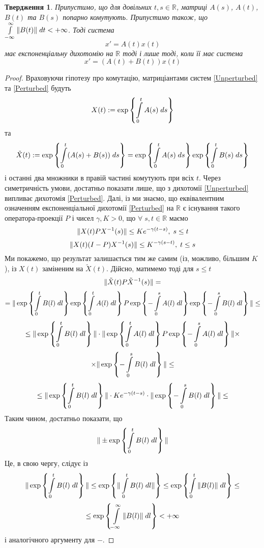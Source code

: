 \documentclass[14pt]{extarticle} %
\title{}
\author{Олексій Леонтьєв}
\let\oldforall\forall
\renewcommand{\forall}{\oldforall\;}
\newtheorem{proposition}{Твердження}
\theoremstyle{remark}
\begin{document}
\maketitle
\begin{proposition}Припустимо, що для довільних $t,s\in\mathbb{R}$, матриці $A(s)$, $A(t)$, $B(t)$ та $B(s)$ попарно комутують.
	Припустимо також, що $\int_{-\infty}^\infty\mynorm{B(t)}\;dt<+\infty$. Тоді система 
	\begin{equation}\label{Unperturbed}
	x'=A(t)x(t)
	\end{equation}
	має експоненціальну дихотомію на $\mathbb{R}$ тоді і лише тоді, коли її має система
	\begin{equation}\label{Perturbed}
	x'=(A(t)+B(t))x(t)
	\end{equation}
\end{proposition}
\begin{proof}Враховуючи гіпотезу про комутацію, матриціантами систем \eqref{Unperturbed} та \eqref{Perturbed} будуть
	\[X(t):=\exp\mycbra{\int_0^tA(s)\;ds}\]
	та \[\tilde{X}(t):=\exp\mycbra{\int_0^t(A(s)+B(s))\;ds}=\exp\mycbra{\int_0^tA(s)\;ds}\exp\mycbra{\int_0^tB(s)\;ds}\]
	і останні два множники в правій частині комутують при всіх $t$.
	Через симетричність умови, достатньо показати лише, що з дихотомії \eqref{Unperturbed} випливає дихотомія \eqref{Perturbed}.
	Далі, із \cite{coppel} ми знаємо, що еквівалентним означенням експоненціальної дихотомії \eqref{Perturbed}
	на $\mathbb{R}$ є існування
	такого оператора-проекції $P$ і чисел $\gamma,K>0$, що $\forall s,t\in\mathbb{R}$ маємо
	\[\|X(t)PX^{-1}(s)\|\leq Ke^{-\gamma(t-s)},\;s\leq t\]
	\[\|X(t)(I-P)X^{-1}(s)\|\leq K^{-\gamma(s-t)},\;t\leq s\]
	Ми покажемо, що результат залишається тим же самим (із, можливо, більшим $K$), із $X(t)$ заміненим на $\tilde{X}(t)$.
	Дійсно, матимемо тоді для $s\leq t$
	\[\|\tilde{X}(t)P\tilde{X}^{-1}(s)\|=\]
	\[=\mynorm{\exp\mycbra{\int_0^tB(l)\;dl}\exp\mycbra{\int_0^tA(l)\;dl}P\exp\mycbra{-\int_0^sA(l)\;dl}
	\exp\mycbra{-\int_0^sB(l)\;dl}}\leq\]
	\[\leq\mynorm{\exp\mycbra{\int_0^tB(l)\;dl}}\cdot\mynorm{\exp\mycbra{\int_0^tA(l)\;dl}P\exp\mycbra{-\int_0^sA(l)\;dl}}\times
	\]\[\times\mynorm{\exp\mycbra{-\int_0^sB(l)\;dl}}\leq\]
	\[\leq\mynorm{\exp\mycbra{\int_0^tB(l)\;dl}}\cdot Ke^{-\gamma(t-s)}\cdot
	\mynorm{\exp\mycbra{-\int_0^sB(l)\;dl}}\leq\]
	Таким чином, достатньо показати, що
	\[\mynorm{\pm\exp\mycbra{\int_0^tB(l)\;dl}}\]
	Це, в свою чергу, слідує із
	\[\mynorm{\exp\mycbra{\int_0^tB(l)\;dl}}\leq\exp\mycbra{\mynorm{\int_0^tB(l)\;dl}}\leq\exp\mycbra{\int_0^t\mynorm{B(l)}\;dl
	}\leq\]
	\[\leq\exp\mycbra{\int_{-\infty}^{\infty}\mynorm{B(l)}\;dl}<+\infty\]
	і аналогічного аргументу для $-$.
\end{proof}
\end{document}
